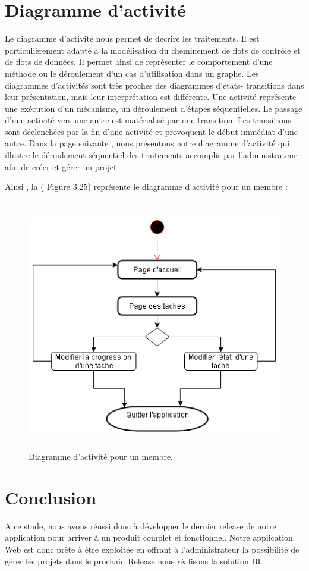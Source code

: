 \section{Diagramme d'activit\'{e}}
Le diagramme d'activit\'{e} nous permet de d\'{e}crire les traitements. Il est
particuli\`{e}rement adapt\'{e} \`{a} la mod\'{e}lisation du cheminement de flots de
contr\^{o}le et de flots de donn\'{e}es. Il permet ainsi de repr\'{e}senter le
comportement d'une m\'{e}thode ou le d\'{e}roulement d'un cas d'utilisation dans
un graphe.
Les diagrammes d'activit\'{e}s sont tr\`{e}s proches des diagrammes d'\'{e}tats-
transitions dans leur pr\'{e}sentation, mais leur interpr\'{e}tation est diff\'{e}rente.
Une activit\'{e} repr\'{e}sente une ex\'{e}cution d'un m\'{e}canisme, un d\'{e}roulement
d'\'{e}tapes s\'{e}quentielles. Le passage d'une activit\'{e} vers une autre est mat\'{e}rialis\'{e}
par une transition.
Les transitions sont d\'{e}clench\'{e}es par la fin d'une activit\'{e} et provoquent le
d\'{e}but imm\'{e}diat d'une autre.
Dans la page suivante , nous pr\'{e}sentons notre diagramme d'activit\'{e} qui illustre le
d\'{e}roulement s\'{e}quentiel des traitements accomplis par l'administrateur afin de
cr\'{e}er et g\'{e}rer un projet.



Ainsi , la ( Figure 3.25)  représente le diagramme d'activit\'{e} pour un membre :
\begin{figure}[H]
\center
\includegraphics[width=13cm,height=11cm]{./figures/activity_m.png}
\caption{Diagramme d'activit\'{e} pour un membre.}

\end{figure}


\section{Conclusion}

A ce stade, nous avons réussi donc à développer le dernier release de notre application pour
arriver à un produit complet et fonctionnel. Notre application Web est donc prête à être
exploitée en offrant à l’administrateur la possibilité de gérer les projets dans le prochain Release nous réalisons la solution BI.

